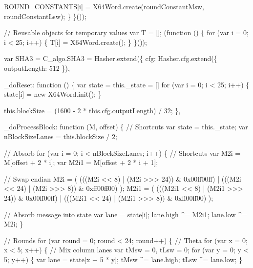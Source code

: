 \begin{DoxyCodeInclude}
            ROUND\_CONSTANTS[i] = X64Word.create(roundConstantMsw, roundConstantLsw);
        \}
    \}());

    \textcolor{comment}{// Reusable objects for temporary values}
    var T = [];
    (\textcolor{keyword}{function} () \{
        \textcolor{keywordflow}{for} (var i = 0; i < 25; i++) \{
            T[i] = X64Word.create();
        \}
    \}());

    var SHA3 = C\_algo.SHA3 = Hasher.extend(\{
        cfg: Hasher.cfg.extend(\{
            outputLength: 512
        \}),

        \_doReset: \textcolor{keyword}{function} () \{
            var state = this.\_state = []
            \textcolor{keywordflow}{for} (var i = 0; i < 25; i++) \{
                state[i] = \textcolor{keyword}{new} X64Word.init();
            \}

            this.blockSize = (1600 - 2 * this.cfg.outputLength) / 32;
        \},

        \_doProcessBlock: \textcolor{keyword}{function} (M, offset) \{
            \textcolor{comment}{// Shortcuts}
            var state = this.\_state;
            var nBlockSizeLanes = this.blockSize / 2;

            \textcolor{comment}{// Absorb}
            \textcolor{keywordflow}{for} (var i = 0; i < nBlockSizeLanes; i++) \{
                \textcolor{comment}{// Shortcuts}
                var M2i  = M[offset + 2 * i];
                var M2i1 = M[offset + 2 * i + 1];

                \textcolor{comment}{// Swap endian}
                M2i = (
                    (((M2i << 8)  | (M2i >>> 24)) & 0x00ff00ff) |
                    (((M2i << 24) | (M2i >>> 8))  & 0xff00ff00)
                );
                M2i1 = (
                    (((M2i1 << 8)  | (M2i1 >>> 24)) & 0x00ff00ff) |
                    (((M2i1 << 24) | (M2i1 >>> 8))  & 0xff00ff00)
                );

                \textcolor{comment}{// Absorb message into state}
                var lane = state[i];
                lane.high ^= M2i1;
                lane.low  ^= M2i;
            \}

            \textcolor{comment}{// Rounds}
            \textcolor{keywordflow}{for} (var round = 0; round < 24; round++) \{
                \textcolor{comment}{// Theta}
                \textcolor{keywordflow}{for} (var x = 0; x < 5; x++) \{
                    \textcolor{comment}{// Mix column lanes}
                    var tMsw = 0, tLsw = 0;
                    \textcolor{keywordflow}{for} (var y = 0; y < 5; y++) \{
                        var lane = state[x + 5 * y];
                        tMsw ^= lane.high;
                        tLsw ^= lane.low;
                    \}


\end{DoxyCodeInclude}
